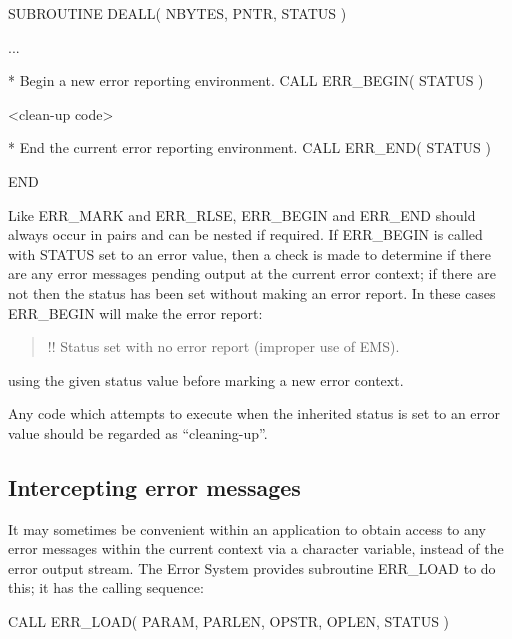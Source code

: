 \documentclass[twoside,11pt]{starlink}
\begin{document}
\begin {small}
\begin{terminalv}
      SUBROUTINE DEALL( NBYTES, PNTR, STATUS )

      ...

*  Begin a new error reporting environment.
      CALL ERR_BEGIN( STATUS )

      <clean-up code>

*  End the current error reporting environment.
      CALL ERR_END( STATUS )

      END
\end{terminalv}
\end {small}

Like ERR\_MARK and ERR\_RLSE, ERR\_BEGIN and ERR\_END should always occur in
pairs and can be nested if required.
If ERR\_BEGIN is called with STATUS set to an error value, then a check is
made to determine if there are any error messages pending output at the
current error context; if there are not then the status has been set without
making an error report.
In these cases ERR\_BEGIN will make the error report:

\begin {quote}
\begin {small}
\begin{terminalv}
!! Status set with no error report (improper use of EMS).
\end{terminalv}
\end {small}
\end{quote}

using the given status value before marking a new error context.

Any code which attempts to execute when the inherited status is set to an error
value should be regarded as ``cleaning-up''.

\subsection{Intercepting error messages \label{intcpt_sect}}
It may sometimes be convenient within an application to obtain access to any
error messages within the current context via a character variable,
instead of the error output stream.
The Error System provides subroutine ERR\_LOAD to do this; it has the
calling sequence:

\begin {small}
\begin{terminalv}
      CALL ERR_LOAD( PARAM, PARLEN, OPSTR, OPLEN, STATUS )
\end{terminalv}
\end {small}
\end{document}
